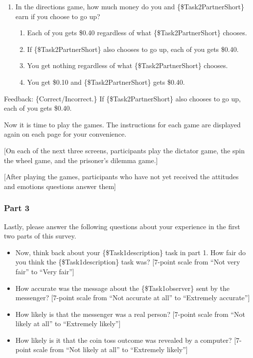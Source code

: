 \begin{description}[listparindent = 1.5em]
    \item[Part 2 Quiz Question 4] \hspace{1cm}
    \begin{enumerate}
        \item In the directions game, how much money do you and
        \{\$Task2PartnerShort\} earn if you choose to go up?
        \begin{enumerate}
            \item Each of you gets \$0.40 regardless of what \{\$Task2PartnerShort\} chooses. 
            \item If \{\$Task2PartnerShort\} also chooses to go up, each of you gets \$0.40. 
            \item You get nothing regardless of what \{\$Task2PartnerShort\} chooses.
            \item You get \$0.10 and \{\$Task2PartnerShort\} gets \$0.40.                      
        \end{enumerate}
    \end{enumerate}

    Feedback: \{Correct/Incorrect.\} If \{\$Task2PartnerShort\} also chooses to go up,
    each of you gets \$0.40.
\end{description}

Now it is time to play the games. The instructions for each game are displayed
again on each page for your convenience. 

[On each of the next three screens,
participants play the dictator game, the spin the wheel game, and the prisoner's
dilemma game.] 

[After playing the games, participants who have not yet received
the attitudes and emotions questions answer them]

\subsubsection*{Part 3}

Lastly, please answer the following questions about your experience in the first
two parts of this survey.

\begin{itemize}
    \item Now, think back about your \{\$Task1description\} task in part 1. How fair do you think the \{\$Task1description\} task was? [7-point scale
    from ``Not very fair'' to ``Very fair'']
    \item How accurate was the message
    about the \{\$Task1observer\} sent by the messenger? [7-point scale from ``Not
    accurate at all'' to ``Extremely accurate'']
    \item How likely is that the messenger was a real person? [7-point scale
    from ``Not likely at all'' to ``Extremely likely'']
    \item How likely is it that
    the coin toss outcome was revealed by a computer? [7-point scale from
    ``Not likely at all'' to ``Extremely likely'']
\end{itemize}

